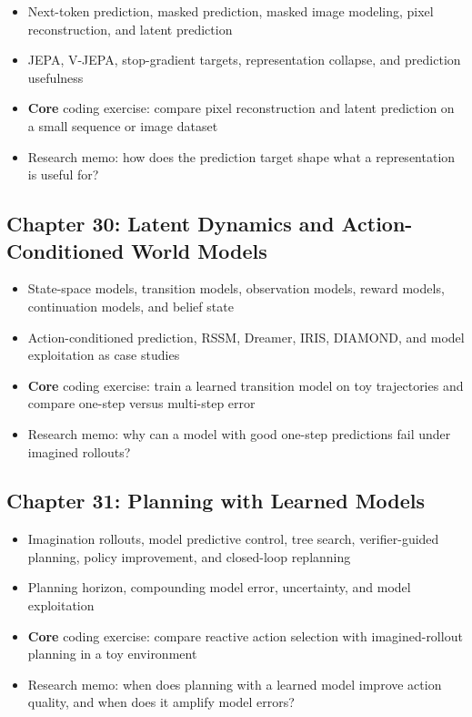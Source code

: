 \documentclass[11pt]{article}
\begin{document}
\begin{itemize}
    \item Next-token prediction, masked prediction, masked image modeling, pixel reconstruction, and latent prediction
    \item JEPA, V-JEPA, stop-gradient targets, representation collapse, and prediction usefulness
    \item \textbf{Core} coding exercise: compare pixel reconstruction and latent prediction on a small sequence or image dataset
    \item Research memo: how does the prediction target shape what a representation is useful for?
\end{itemize}

\subsection{Chapter 30: Latent Dynamics and Action-Conditioned World Models}

\begin{itemize}
    \item State-space models, transition models, observation models, reward models, continuation models, and belief state
    \item Action-conditioned prediction, RSSM, Dreamer, IRIS, DIAMOND, and model exploitation as case studies
    \item \textbf{Core} coding exercise: train a learned transition model on toy trajectories and compare one-step versus multi-step error
    \item Research memo: why can a model with good one-step predictions fail under imagined rollouts?
\end{itemize}

\subsection{Chapter 31: Planning with Learned Models}

\begin{itemize}
    \item Imagination rollouts, model predictive control, tree search, verifier-guided planning, policy improvement, and closed-loop replanning
    \item Planning horizon, compounding model error, uncertainty, and model exploitation
    \item \textbf{Core} coding exercise: compare reactive action selection with imagined-rollout planning in a toy environment
    \item Research memo: when does planning with a learned model improve action quality, and when does it amplify model errors?
\end{itemize}
\end{document}
